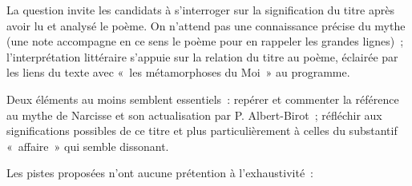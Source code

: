 {La question invite les candidats à s'interroger sur la signification du titre après
avoir lu et analysé le poème. On n'attend pas une connaissance précise du mythe (une
note accompagne en ce sens le poème pour en rappeler les grandes lignes)~;
l'interprétation littéraire s'appuie sur la relation du titre au poème, éclairée par les liens
du texte avec «~les métamorphoses du Moi~» au programme.

Deux éléments au moins semblent essentiels~: repérer et commenter la
référence au mythe de Narcisse et son actualisation par P. Albert-Birot~; réfléchir aux
significations possibles de ce titre et plus particulièrement à celles du substantif
«~affaire~» qui semble dissonant.

Les pistes proposées n'ont aucune prétention à l'exhaustivité~:

}
